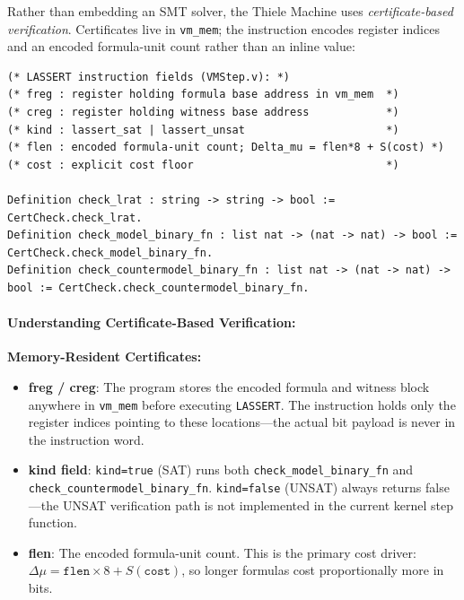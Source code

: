 Rather than embedding an SMT solver, the Thiele Machine uses \textit{certificate-based verification}. Certificates live in \texttt{vm\_mem}; the instruction encodes register indices and an encoded formula-unit count rather than an inline value:
\begin{lstlisting}
(* LASSERT instruction fields (VMStep.v): *)
(* freg : register holding formula base address in vm_mem  *)
(* creg : register holding witness base address            *)
(* kind : lassert_sat | lassert_unsat                      *)
(* flen : encoded formula-unit count; Delta_mu = flen*8 + S(cost) *)
(* cost : explicit cost floor                              *)

Definition check_lrat : string -> string -> bool := CertCheck.check_lrat.
Definition check_model_binary_fn : list nat -> (nat -> nat) -> bool := CertCheck.check_model_binary_fn.
Definition check_countermodel_binary_fn : list nat -> (nat -> nat) -> bool := CertCheck.check_countermodel_binary_fn.
\end{lstlisting}

\paragraph{Understanding Certificate-Based Verification:}
\textbf{Memory-Resident Certificates:}
\begin{itemize}
    \item \textbf{freg / creg}: The program stores the encoded formula and witness block anywhere in \texttt{vm\_mem} before executing \texttt{LASSERT}. The instruction holds only the register indices pointing to these locations---the actual bit payload is never in the instruction word.
    \item \textbf{kind field}: \texttt{kind=true} (SAT) runs both \texttt{check\_model\_binary\_fn} and \texttt{check\_countermodel\_binary\_fn}. \texttt{kind=false} (UNSAT) always returns false---the UNSAT verification path is not implemented in the current kernel step function.
    \item \textbf{flen}: The encoded formula-unit count. This is the primary cost driver: $\Delta\mu = \mathtt{flen} \times 8 + S(\mathtt{cost})$, so longer formulas cost proportionally more in bits.
\end{itemize}

